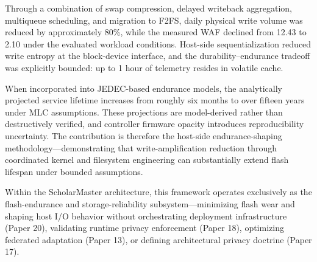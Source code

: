\documentclass[conference]{IEEEtran}
\begin{document}
Through a combination of swap compression, delayed writeback aggregation, multiqueue scheduling, and migration to F2FS, daily physical write volume was reduced by approximately 80\%, while the measured WAF declined from 12.43 to 2.10 under the evaluated workload conditions. Host-side sequentialization reduced write entropy at the block-device interface, and the durability--endurance tradeoff was explicitly bounded: up to 1 hour of telemetry resides in volatile cache.

When incorporated into JEDEC-based endurance models, the analytically projected service lifetime increases from roughly six months to over fifteen years under MLC assumptions. These projections are model-derived rather than destructively verified, and controller firmware opacity introduces reproducibility uncertainty. The contribution is therefore the host-side endurance-shaping methodology---demonstrating that write-amplification reduction through coordinated kernel and filesystem engineering can substantially extend flash lifespan under bounded assumptions.

Within the ScholarMaster architecture, this framework operates exclusively as the flash-endurance and storage-reliability subsystem---minimizing flash wear and shaping host I/O behavior without orchestrating deployment infrastructure (Paper 20), validating runtime privacy enforcement (Paper 18), optimizing federated adaptation (Paper 13), or defining architectural privacy doctrine (Paper 17).
\end{document}
